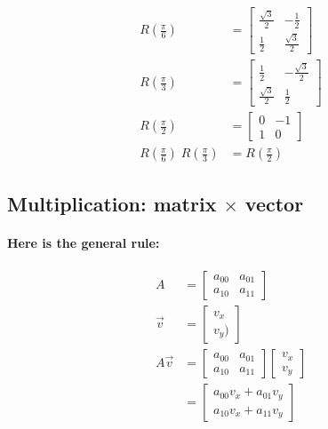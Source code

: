 \documentclass[twoside]{article}
\begin{document}
\begin{align*}
  R(\frac{\pi}{6}) & = \left[ \begin{array}{rr}
    \frac{\sqrt{3}}{2} & -\frac{1}{2} \\
    \frac{1}{2} & \frac{\sqrt{3}}{2}
    \end{array} \right] \\
  R(\frac{\pi}{3}) & = \left[ \begin{array}{rr}
    \frac{1}{2} & -\frac{\sqrt{3}}{2} \\
    \frac{\sqrt{3}}{2} & \frac{1}{2}
    \end{array} \right] \\
  R(\frac{\pi}{2}) & = \left[ \begin{array}{rr}
    0 & -1 \\
    1 & 0
    \end{array} \right] \\
  R(\frac{\pi}{6}) \; R(\frac{\pi}{3}) & = R(\frac{\pi}{2}) 
  \end{align*}

\subsection{Multiplication: matrix $\times$ vector}

\paragraph{Here is the general rule:}

\begin{align*}
  A & = \left[ \begin{array}{rr}
    a_{00} & a_{01} \\
    a_{10} & a_{11}
    \end{array} \right] \\
  \vec{v} & = \left[ \begin{array}{r}
    v_x \\
    v_y )  
    \end{array} \right] \\
  A \vec{v} & =
    \left[ \begin{array}{rr}
      a_{00} & a_{01} \\
      a_{10} & a_{11}
      \end{array} \right]
    \left[ \begin{array}{r}
      v_x \\
      v_y
      \end{array} \right] \\
  & =
    \left[ \begin{array}{rr}
      a_{00} v_x + a_{01} v_y \\
      a_{10} v_x + a_{11} v_y
      \end{array} \right]
  \end{align*}
\end{document}
